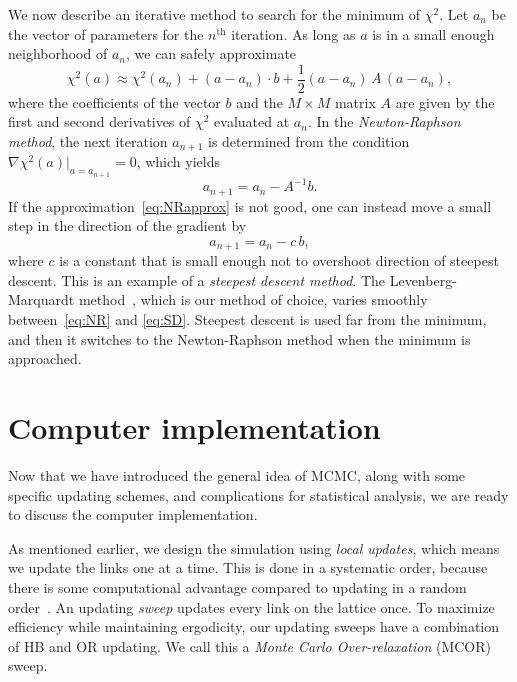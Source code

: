 We now describe an iterative method to search for the minimum of $\chi^2$.
Let $a_n$ be the vector of parameters for the $n^{\text{th}}$ iteration.
As long as $a$ is in a small enough neighborhood of $a_n$, we can safely
approximate
\begin{equation}\label{eq:NRapprox}
  \chi^2(a)\approx\chi^2(a_n)+(a-a_n)\cdot b
           +\frac{1}{2}(a-a_n)\,A\,(a-a_n),
\end{equation}
where the coefficients of the vector $b$ and the $M\times M$ matrix $A$ 
are given by the first and second derivatives of $\chi^2$ evaluated at $a_n$.
In the {\it Newton-Raphson method}, the next 
iteration $a_{n+1}$ is
determined from the condition $\nabla\chi^2(a)|_{a=a_{n+1}}=0$,
which yields
\begin{equation}\label{eq:NR}
  a_{n+1}=a_n-A^{-1}b.
\end{equation}
If the approximation~\eqref{eq:NRapprox} is not good, one can instead move
a small step in the direction of the gradient by
\begin{equation}\label{eq:SD}
  a_{n+1}=a_n-c\,b,
\end{equation}
where $c$ is a constant that is small enough not to overshoot direction
of steepest descent. This is an example of a {\it steepest descent method}.
The Levenberg-Marquardt 
method~\cite{levenberg_method_1944,marquardt_algorithm_1963}, which is 
our method of choice, varies smoothly between~\eqref{eq:NR} and 
\eqref{eq:SD}. Steepest descent is used far from the minimum, and 
then it switches to the Newton-Raphson method when the minimum is approached.

\section{Computer implementation}\label{sec:implement}

Now that we have introduced the general idea of MCMC, along with some specific
updating schemes, and complications for statistical analysis, we are ready 
to discuss the computer implementation. 

As mentioned earlier, we design the simulation using {\it local updates}, which
means we update the links one at a time. This is done in a systematic order,
because there is some computational advantage compared to updating in a
random order~\cite{berg_markov_2004}. 
An updating {\it sweep} updates every link on the lattice once. 
To maximize efficiency while maintaining ergodicity, our updating sweeps 
have a combination of HB and OR updating. We call this a 
{\it Monte Carlo Over-relaxation} (MCOR) sweep.

